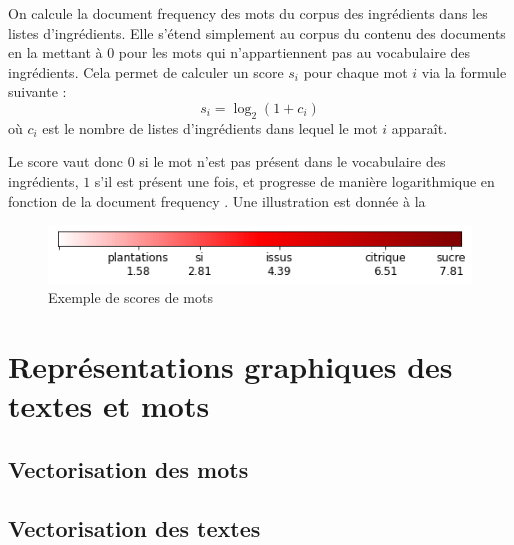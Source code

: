         On calcule la \og document frequency \fg des mots du corpus des ingrédients dans les listes d'ingrédients.
        Elle s'étend simplement au corpus du contenu des documents en la mettant à 0 pour les mots qui n'appartiennent pas au vocabulaire des ingrédients.
        Cela permet de calculer un score $s_{i}$ pour chaque mot $i$ via la formule suivante :
        \[s_{i} = \log_{2}(1 + c_{i})\]
        où $c_{i}$ est le nombre de listes d'ingrédients dans lequel le mot $i$ apparaît.
       
        Le score vaut donc $0$ si le mot n'est pas présent dans le vocabulaire des ingrédients, $1$ s'il est présent une fois, et progresse de manière logarithmique en fonction de la \og document frequency \fg. Une illustration est donnée à la 

        \begin{figure}[htbp]
            \begin{center}
            \includegraphics[width=0.6\linewidth]{img/scores_bar.png}
            \end{center}
            \caption{Exemple de scores de mots}
            \label{fig:scores_bar}
        \end{figure}

        \section{Représentations graphiques des textes et mots}

            \subsection{Vectorisation des mots}

            \subsection{Vectorisation des textes}